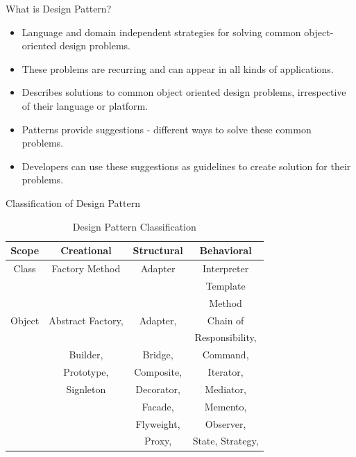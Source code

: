 \documentclass[13pt]{beamer}
\begin{document}
\begin{frame}{What is Design Pattern?}
	\begin{itemize}
		\item Language and domain independent strategies for solving common object-oriented design 					  problems.
		\item These problems are recurring and can appear in all kinds of applications.
		\item Describes solutions to common object oriented design problems, irrespective of their 					  language or platform.
		\item Patterns provide suggestions - different ways to solve these common problems.
		\item Developers can use these suggestions as guidelines to create solution for their 						  problems.
	\end{itemize}
\end{frame}

\begin{frame}{Classification of Design Pattern}
\begin{table}[h!]
  \begin{center}
    \caption{Design Pattern Classification}
    \begin{tabular}{|c|c|c|c|} %
		\hline      
      	\textbf{Scope} & \textbf{Creational} & \textbf{Structural} & \textbf{Behavioral}\\
		\hline	  	
	  	Class & Factory Method & Adapter & Interpreter \\
	  		& 				& 		  & Template\\
	  		&				&		  & Method\\    
      	\hline
      	Object & Abstract Factory, & Adapter, & Chain of\\ 
      		 &				   & 		 & Responsibility,\\
       		 & Builder, & Bridge, & Command,\\
       		 & Prototype, & Composite, & Iterator,\\
       		 & Signleton & Decorator, & Mediator,\\
       		 & 			 & Facade, & Memento,\\
       		 &			 & Flyweight, & Observer,\\
       		 &			 & Proxy, & State, Strategy,\\
      	\hline
    \end{tabular}
  \end{center}
\end{table}
\end{frame}
\end{document}
